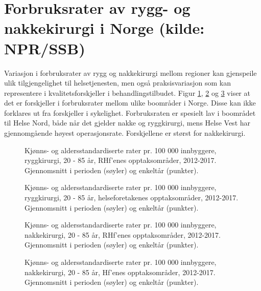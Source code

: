 \documentclass [norsk,a4paper,twoside]{article}\usepackage[]{graphicx}\usepackage[]{color}
\begin{document}
\section{Forbruksrater av rygg- og nakkekirurgi i Norge (kilde: NPR/SSB)}
Variasjon i forbruksrater av rygg og nakkekirurgi mellom regioner kan 
gjenspeile ulik tilgjengelighet til helsetjenesten, men også praksisvariasjon som kan
representere i kvalitetsforskjeller i behandlingstilbudet. Figur \ref{fig:AA_Ryggkirurgi_BoRHF1}, \ref{fig:AA_Ryggkirurgi_BoHF1} og \ref{fig:AA_Nakkekirurgi_BoRHF1} viser at det
er forskjeller i forbruksrater mellom ulike boområder i Norge. Disse kan ikke
forklares ut fra forskjeller i sykelighet. Forbruksraten er spesielt lav i boområdet til
Helse Nord, både når det gjelder nakke og ryggkirurgi, mens Helse Vest har gjennomgående høyest operasjonsrate. Forskjellene er størst for nakkekirurgi.

\begin{figure}[ht]
\caption{Kjønns- og aldersstandardiserte rater pr. 100 000 innbyggere, ryggkirurgi, 20 - 85 år, RHf’enes opptaksområder, 2012-2017. Gjennomsnitt i perioden (søyler) og enkeltår (punkter).}
\label{fig:AA_Ryggkirurgi_BoRHF1}
\end{figure}

\begin{figure}[ht]
\caption{Kjønns- og aldersstandardiserte rater pr. 100 000 innbyggere, ryggkirurgi, 20 - 85 år, helseforetakenes opptaksområder, 2012-2017. Gjennomsnitt i perioden (søyler) og enkeltår (punkter).}
\label{fig:AA_Ryggkirurgi_BoHF1}
\end{figure}


\begin{figure}[ht]
\caption{Kjønns- og aldersstandardiserte rater pr. 100 000 innbyggere, nakkekirurgi, 20 - 85 år, RHf’enes opptaksområder, 2012-2017. Gjennomsnitt i perioden (søyler) og enkeltår (punkter).}
\label{fig:AA_Nakkekirurgi_BoRHF1}
\end{figure}

\begin{figure}[ht]
\caption{Kjønns- og aldersstandardiserte rater pr. 100 000 innbyggere, nakkekirurgi, 20 - 85 år, Hf’enes opptaksområder, 2012-2017. Gjennomsnitt i perioden (søyler) og enkeltår (punkter).}
\label{fig:AA_Nakkekirurgi_BoHF1}
\end{figure}
\end{document}
